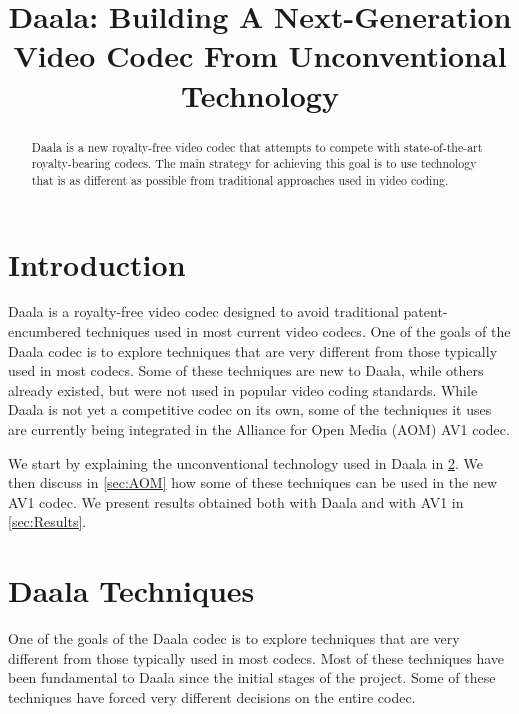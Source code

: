 \documentclass[english,conference,10pt]{IEEEtran}
\begin{document}
\title{Daala: Building A Next-Generation Video Codec From Unconventional
Technology}


\author{
}
\maketitle
\begin{abstract}
Daala is a new royalty-free video codec that attempts to compete with
state-of-the-art royalty-bearing codecs. The main strategy for achieving this
goal is to use technology that is as different as possible from traditional
approaches used in video coding.
\end{abstract}


\section{Introduction}

Daala is a royalty-free video codec designed to avoid traditional
patent-encumbered techniques used in most current video codecs. One
of the goals of the Daala codec is to explore techniques that are
very different from those typically used in most codecs. Some of
these techniques are new to Daala, while others already existed, but
were not used in popular video coding standards. While Daala is not yet
a competitive codec on its own, some of the techniques it uses are
currently being integrated in the Alliance for Open Media (AOM) AV1 codec.

We start by explaining the unconventional technology used in Daala
in \cref{sec:techniques}. We then discuss in \cref{sec:AOM} how some of
these techniques can be used in the new AV1 codec. We present results
obtained both with Daala and with AV1 in \cref{sec:Results}.

\section{Daala Techniques}
\label{sec:techniques}

One of the goals of the Daala codec is to explore techniques that
are very different from those typically used in most codecs. Most
of these techniques have been fundamental to Daala since the initial
stages of the project. Some of these techniques have forced very different
decisions on the entire codec.
\end{document}
